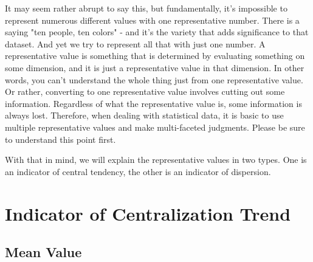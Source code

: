 \documentclass{ltjbook}
\begin{document}
It may seem rather abrupt to say this, but fundamentally, it's impossible to represent numerous different values with one representative number. There is a saying "ten people, ten colors" - and it's the variety that adds significance to that dataset. And yet we try to represent all that with just one number. A representative value is something that is determined by evaluating something on some dimension, and it is just a representative value in that dimension. In other words, you can't understand the whole thing just from one representative value. Or rather, converting to one representative value involves cutting out some information. Regardless of what the representative value is, some information is always lost. Therefore, when dealing with statistical data, it is basic to use multiple representative values and make multi-faceted judgments. Please be sure to understand this point first.

With that in mind, we will explain the representative values in two types. One is an indicator of central tendency, the other is an indicator of dispersion.

\section{Indicator of Centralization Trend}
\subsection{Mean Value}
\end{document}
